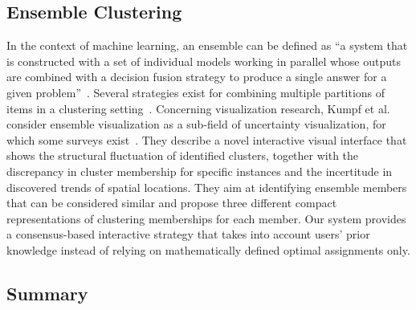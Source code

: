 

\subsection{Ensemble Clustering}

In the context of machine learning, an ensemble can be defined as ``a system that is constructed with a set of individual models working in parallel whose outputs are combined with a decision fusion strategy to produce a single answer for a given problem''~\cite{wangFundamentalIssuesEnsemble2008}. Several strategies exist for combining multiple partitions of items in a clustering setting~\cite{strehl2002cluster}.
Concerning visualization research, Kumpf et al.~\cite{kumpfVisualizingConfidenceClusterBased2018} consider ensemble visualization as a sub-field of uncertainty visualization, for which some surveys exist~\cite{bonneauOverviewStateoftheArtUncertainty2014, maceachrenVisualizingGeospatialInformation2005}. They describe a novel interactive visual interface that shows the structural fluctuation of identified clusters, together with the discrepancy in cluster membership for specific instances and the incertitude in discovered trends of spatial locations.
They aim at identifying ensemble members that can be considered similar and propose three different compact representations of clustering memberships for each member.
Our system provides a consensus-based interactive strategy that takes into account users' prior knowledge instead of relying on mathematically defined optimal assignments only.

\subsection{Summary}\label{sec:summary}

